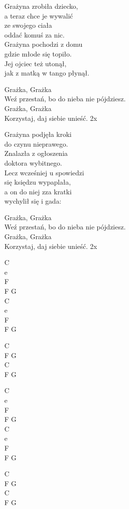 \begin{text}
    Grażyna zrobiła dziecko,\\
    a teraz chce je wywalić\\
    ze swojego ciała\\
    oddać komuś za nic.\\
    Grażyna pochodzi z domu\\
    gdzie młode się topiło.\\
    Jej ojciec też utonął,\\
    jak z matką w tango płynął.

    Grażka, Grażka\\
    Weź przestań, bo do nieba nie pójdziesz.\\
    Grażka, Grażka\\
    Korzystaj, daj siebie unieść. 2x

    Grażyna podjęła kroki\\
    do czynu nieprawego.\\
    Znalazła z ogłoszenia\\
    doktora wybitnego.\\
    Lecz wcześniej u spowiedzi\\
    się księdzu wypaplała,\\
    a on do niej zza kratki\\
    wychylił się i gada:

    Grażka, Grażka\\
    Weź przestań, bo do nieba nie pójdziesz.\\
    Grażka, Grażka\\
    Korzystaj, daj siebie unieść. 2x
\end{text}
\begin{chord}
    C\\
    e\\
    F\\
    F G\\
    C\\
    e\\
    F\\
    F G

    C\\
    F G\\
    C\\
    F G

    C\\
    e\\
    F\\
    F G\\
    C\\
    e\\
    F\\
    F G

    C\\
    F G\\
    C\\
    F G
\end{chord}